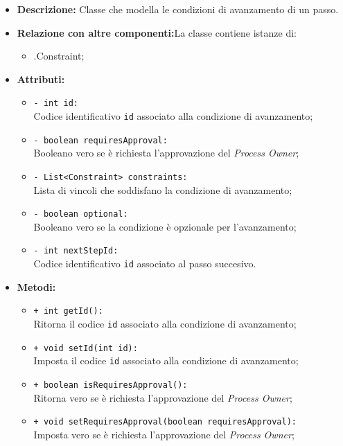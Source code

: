 \begin{flushleft}
\begin{itemize}
\item \textbf{Descrizione:} Classe che modella le condizioni di avanzamento di un passo.
\item \textbf{Relazione con altre componenti:}La classe contiene istanze di:
		\begin{itemize}
			\item \smodel{}.Constraint;
		\end{itemize}
\item \textbf{Attributi:}
\begin{sloppypar}
\begin{itemize}
\item \texttt{- int id:}\\ Codice identificativo \texttt{id} associato alla condizione di avanzamento;
\item \texttt{- boolean requiresApproval:}\\ Booleano vero se è richiesta l'approvazione del \textit{Process Owner};
\item \texttt{- List<Constraint> constraints:}\\ Lista di vincoli che soddisfano la condizione di avanzamento;
\item \texttt{- boolean optional:}\\ Booleano vero se la condizione è opzionale per l'avanzamento;
\item \texttt{- int nextStepId:}\\ Codice identificativo \texttt{id} associato al passo succesivo.
\end{itemize}
\end{sloppypar}
\item \textbf{Metodi:}
\begin{sloppypar}
\begin{itemize}
\item \texttt{+ int getId():}\\ Ritorna il codice \texttt{id} associato alla condizione di avanzamento;
\item \texttt{+ void setId(int id):}\\ Imposta il codice \texttt{id} associato alla condizione di avanzamento;
\item \texttt{+ boolean isRequiresApproval():}\\ Ritorna vero se è richiesta l'approvazione del \textit{Process Owner};
\item \texttt{+ void setRequiresApproval(boolean requiresApproval):}\\ Imposta vero se è richiesta l'approvazione del \textit{Process Owner};

\end{itemize}
\end{sloppypar}
\end{itemize}
\end{flushleft}
